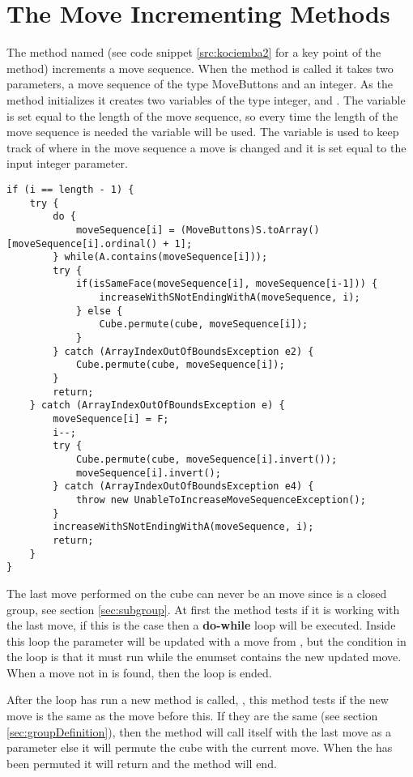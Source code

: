 \section{The Move Incrementing Methods}
\label{sec:increaseWithSNotEndingWithA}
The method named  (see code snippet \ref{src:kociemba2} for a key point of the method) increments a move sequence.
When the method is called it takes two parameters, a move sequence of the type MoveButtons and an integer.
As the method initializes it creates two variables of the type integer,  and .
The variable  is set equal to the length of the move sequence, so every time the length of the move sequence is needed the variable  will be used.
The variable  is used to keep track of where in the move sequence a move is changed and it is set equal to the input integer parameter. 

\begin{lstlisting}[style=sourceCode, caption=\myCaption{Key point in the incrementing method of kociemba's optimal solver}, label=src:kociemba2]
if (i == length - 1) {
	try {
		do {
			moveSequence[i] = (MoveButtons)S.toArray()[moveSequence[i].ordinal() + 1];
		} while(A.contains(moveSequence[i]));
		try {
			if(isSameFace(moveSequence[i], moveSequence[i-1])) {
				increaseWithSNotEndingWithA(moveSequence, i);
			} else {
				Cube.permute(cube, moveSequence[i]);
			}
		} catch (ArrayIndexOutOfBoundsException e2) {
			Cube.permute(cube, moveSequence[i]);
		}
		return;
	} catch (ArrayIndexOutOfBoundsException e) {
		moveSequence[i] = F;
		i--;
		try {
			Cube.permute(cube, moveSequence[i].invert());
			moveSequence[i].invert();
		} catch (ArrayIndexOutOfBoundsException e4) {
			throw new UnableToIncreaseMoveSequenceException();
		}
		increaseWithSNotEndingWithA(moveSequence, i);
		return;
	}
}
\end{lstlisting}

The last move performed on the cube can never be an  move since  is a closed group, see section \ref{sec:subgroup}.
At first the method tests if it is working with the last move, if this is the case then a \textbf{do-while} loop will be executed.
Inside this loop the parameter  will be updated with a move from , but the condition in the loop is that it must run while the enumset  contains the new updated move.
When a move not in  is found, then the loop is ended.

After the loop has run a new method is called, , this method tests if the new move is the same as the move before this.
If they are the same (see section \ref{sec:groupDefinition}), then the method will call itself with the last move as a parameter else it will permute the cube with the current move.
When the \rubik{} has been permuted it will return and the method will end.

